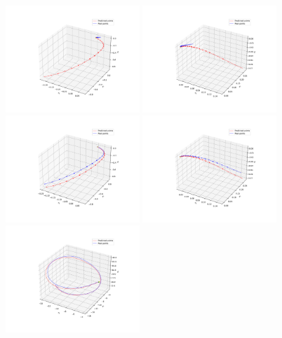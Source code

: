 \documentclass{article}
\begin{document}
\begin{figure}[thb]
  \centering
  \includegraphics[width=0.45\textwidth]{./figs/baseline_vs_data_0_to_20.pdf}
  \includegraphics[width=0.45\textwidth]{./figs/fehlberg_vs_data_0_to_20.pdf}\\
  \includegraphics[width=0.45\textwidth]{./figs/baseline_vs_recover_0_to_20.pdf}
  \includegraphics[width=0.45\textwidth]{./figs/fehlberg_vs_recover_0_to_20.pdf}\\
  \includegraphics[width=0.45\textwidth]{./figs/baseline_vs_recover_1000_to_1100.pdf}

\end{figure}
\end{document}
